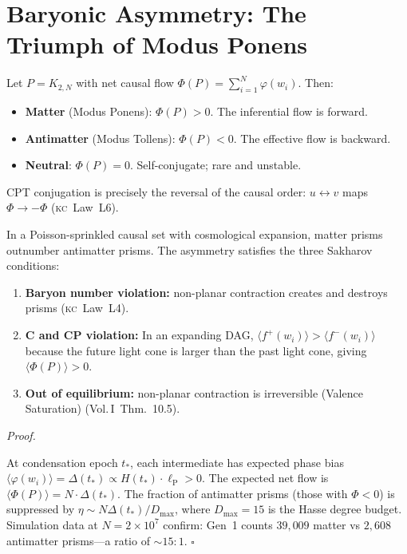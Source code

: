 \documentclass[11pt, a4paper, openany]{book}
\newcommand{\lP}{\ell_{\mathrm{P}}}
\newcommand{\KC}[1]{\textnormal{(\textsc{kc}~#1)}}
\newcommand{\VolI}[1]{\textnormal{(Vol.\,I~#1)}}
\newcounter{thm}[chapter]
\renewenvironment{proof}[1][Proof]{%
  \par\noindent\textit{#1.}\quad
}{\hfill$\square$\par\medskip}
\begin{document}
\section{Baryonic Asymmetry: The Triumph of Modus Ponens}\label{sec:baryogenesis}

\begin{definition}\label{def:matter-antimatter}
Let $P = K_{2,N}$ with net causal flow $\Phi(P) = \sum_{i=1}^{N} \varphi(w_i)$. Then:
\begin{itemize}
  \item \textbf{Matter} (Modus Ponens): $\Phi(P) > 0$. The inferential flow is forward.
  \item \textbf{Antimatter} (Modus Tollens): $\Phi(P) < 0$. The effective flow is backward.
  \item \textbf{Neutral}: $\Phi(P) = 0$. Self-conjugate; rare and unstable.
\end{itemize}
CPT conjugation is precisely the reversal of the causal order: $u \leftrightarrow v$ maps $\Phi \to -\Phi$ \KC{Law~L6}.
\end{definition}

\begin{theorem}\label{thm:baryogenesis}
In a Poisson-sprinkled causal set with cosmological expansion, matter prisms outnumber antimatter prisms. The asymmetry satisfies the three Sakharov conditions:
\begin{enumerate}
  \item \textbf{Baryon number violation:} non-planar contraction creates and destroys prisms \KC{Law~L4}.
  \item \textbf{C and CP violation:} In an expanding DAG, $\langle f^+(w_i)\rangle > \langle f^-(w_i)\rangle$ because the future light cone is larger than the past light cone, giving $\langle\Phi(P)\rangle > 0$.
  \item \textbf{Out of equilibrium:} non-planar contraction is irreversible (Valence Saturation) \VolI{Thm.~10.5}.
\end{enumerate}
\end{theorem}

\begin{proof}
At condensation epoch $t_*$, each intermediate has expected phase bias $\langle\varphi(w_i)\rangle = \Delta(t_*) \propto H(t_*) \cdot \lP > 0$. The expected net flow is $\langle\Phi(P)\rangle = N \cdot \Delta(t_*)$. The fraction of antimatter prisms (those with $\Phi < 0$) is suppressed by $\eta \sim N\Delta(t_*)/D_{\max}$, where $D_{\max} = 15$ is the Hasse degree budget. Simulation data at $N = 2 \times 10^7$ confirm: Gen~1 counts $39{,}009$ matter vs $2{,}608$ antimatter prisms---a ratio of $\sim 15{:}1$.
\end{proof}
\end{document}
